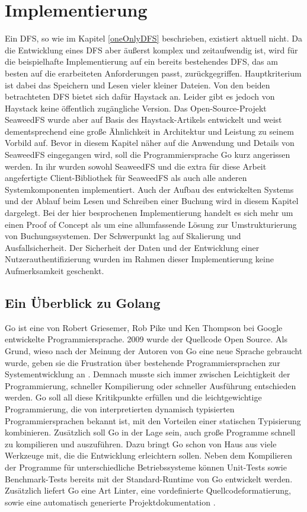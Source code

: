 \documentclass[12pt,oneside,a4paper,parskip]{scrbook}
\begin{document}
\chapter{Implementierung}
\label{implementation}
Ein DFS, so wie im Kapitel \ref{oneOnlyDFS} beschrieben, existiert aktuell nicht. Da die Entwicklung eines DFS aber äußerst komplex und zeitaufwendig ist, wird für die beispielhafte Implementierung auf ein bereits bestehendes DFS, das am besten auf die erarbeiteten Anforderungen passt, zurückgegriffen. Hauptkriterium ist dabei das Speichern und Lesen vieler kleiner Dateien. Von den beiden betrachteten DFS bietet sich dafür Haystack an. Leider gibt es jedoch von Haystack keine öffentlich zugängliche Version. Das Open-Source-Projekt SeaweedFS wurde aber auf Basis des Haystack-Artikels entwickelt und weist dementsprechend eine große Ähnlichkeit in Architektur und Leistung zu seinem Vorbild auf. Bevor in diesem Kapitel näher auf die Anwendung und Details von SeaweedFS eingegangen wird, soll die Programmiersprache Go kurz angerissen werden. In ihr wurden sowohl SeaweedFS und die extra für diese Arbeit angefertigte Client-Bibliothek für SeaweedFS als auch alle anderen Systemkomponenten implementiert. Auch der Aufbau des entwickelten Systems und der Ablauf beim Lesen und Schreiben einer Buchung wird in diesem Kapitel dargelegt. Bei der hier besprochenen Implementierung handelt es sich mehr um einen Proof of Concept als um eine allumfassende Lösung zur Umstrukturierung von Buchungssystemen. Der Schwerpunkt lag auf Skalierung und Ausfallsicherheit. Der Sicherheit der Daten und der Entwicklung einer Nutzerauthentifizierung wurden im Rahmen dieser Implementierung keine Aufmerksamkeit geschenkt.

\section{Ein Überblick zu Golang}
Go ist eine von Robert Griesemer, Rob Pike und Ken Thompson bei Google entwickelte Programmiersprache. 2009 wurde der Quellcode Open Source. Als Grund, wieso nach der Meinung der Autoren von Go eine neue Sprache gebraucht wurde, geben sie die Frustration über bestehende Programmiersprachen zur Systementwicklung an \cite{gofaq}. Demnach musste sich immer zwischen Leichtigkeit der Programmierung, schneller Kompilierung oder schneller Ausführung entschieden werden. Go soll all diese Kritikpunkte erfüllen und die  leichtgewichtige Programmierung, die von interpretierten dynamisch typisierten Programmiersprachen bekannt ist, mit den Vorteilen einer statischen Typisierung kombinieren. Zusätzlich soll Go in der Lage sein, auch große Programme schnell zu kompilieren und auszuführen. Dazu bringt Go schon von Haus aus viele Werkzeuge mit, die die Entwicklung erleichtern sollen. Neben dem Kompilieren der Programme für unterschiedliche Betriebssysteme können Unit-Tests sowie Benchmark-Tests bereits mit der Standard-Runtime von Go entwickelt werden. Zusätzlich liefert Go eine Art Linter, eine vordefinierte Quellcodeformatierung, sowie eine automatisch generierte Projektdokumentation \cite{gocommands}.
\end{document}
